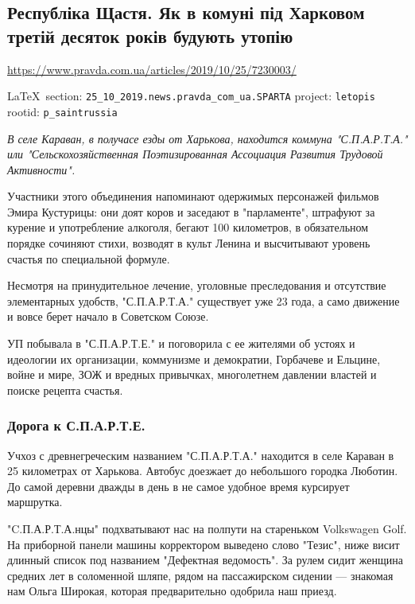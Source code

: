  
 
\subsection{Республіка Щастя. Як в комуні під Харковом третій десяток років будують утопію}
\url{https://www.pravda.com.ua/articles/2019/10/25/7230003/}
  
\vspace{0.5cm}
 {\ifDEBUG\small\LaTeX~section: \verb|25_10_2019.news.pravda_com_ua.SPARTA| project: \verb|letopis| rootid: \verb|p_saintrussia| \fi}
\vspace{0.5cm}

{\em
В селе Караван, в получасе езды от Харькова, находится коммуна "С.П.А.Р.Т.А."
или "Сельскохозяйственная Поэтизированная Ассоциация Развития Трудовой
Активности". 

Участники этого объединения напоминают одержимых персонажей фильмов Эмира
Кустурицы: они доят коров и заседают в "парламенте", штрафуют за курение и
употребление алкоголя, бегают 100 километров, в обязательном порядке сочиняют
стихи, возводят в культ Ленина и высчитывают уровень счастья по специальной
формуле. 

Несмотря на принудительное лечение, уголовные преследования и отсутствие
элементарных удобств, "С.П.А.Р.Т.А." существует уже 23 года, а само движение и
вовсе берет начало в Советском Союзе.

УП побывала в "С.П.А.Р.Т.Е." и поговорила с ее жителями об устоях и идеологии
их организации, коммунизме и демократии, Горбачеве и Ельцине, войне и мире, ЗОЖ
и вредных привычках, многолетнем давлении властей и поиске рецепта счастья.
}

\subsubsection{Дорога к С.П.А.Р.Т.Е.}

Учхоз с древнегреческим названием "С.П.А.Р.Т.А." находится в селе Караван в 25
километрах от Харькова. Автобус доезжает до небольшого городка Люботин. До
самой деревни дважды в день в не самое удобное время курсирует маршрутка.

"C.П.А.Р.Т.А.нцы" подхватывают нас на полпути на стареньком Volkswagen Golf. На
приборной панели машины корректором выведено слово "Тезис", ниже висит длинный
список под названием "Дефектная ведомость". За рулем сидит женщина средних лет
в соломенной шляпе, рядом на пассажирском сидении --- знакомая нам Ольга Широкая,
которая предварительно одобрила наш приезд.

